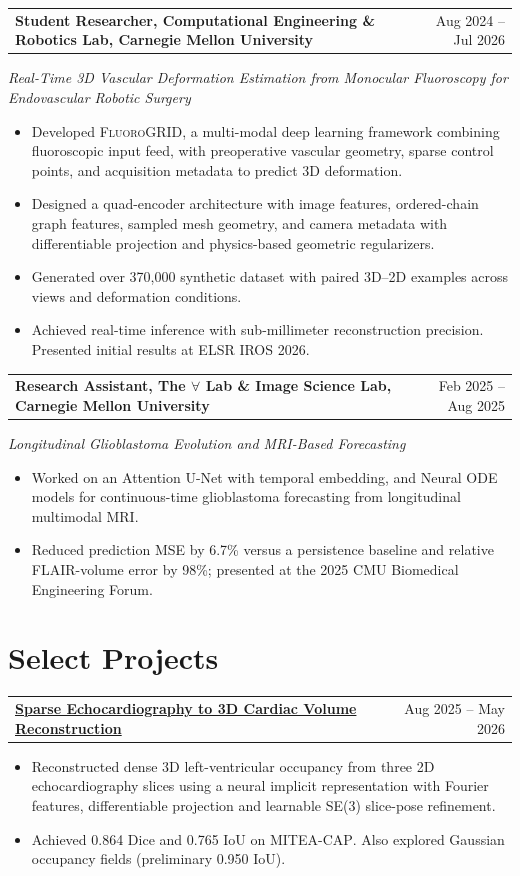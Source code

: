 \documentclass[letterpaper,10pt]{article}
\makeatletter
\newlength{\entrygap}
\newcommand{\cvProject}[2]{%
  \needspace{3\baselineskip}%
  \begin{tabularx}{\textwidth}{@{}X@{\hspace{0.5em}}r@{}}
    \textbf{#1} & {\small #2}
  \end{tabularx}\par\vspace{1pt}%
}
\newenvironment{cvitems}{%
  \begin{itemize}[leftmargin=0.17in,label=\textbullet,
    topsep=0pt,itemsep=2pt,parsep=0pt,partopsep=0pt]
  \normalsize
}{%
  \end{itemize}\vspace{\entrygap}%
}
\makeatother
\begin{document}
\cvProject{Student Researcher\textnormal{, Computational Engineering \& Robotics Lab, Carnegie Mellon University}}{Aug 2024 -- Jul 2026}
{\small\textit{Real-Time 3D Vascular Deformation Estimation from Monocular Fluoroscopy for Endovascular Robotic Surgery}}\par\vspace{2pt}
\begin{cvitems}
  \item Developed {\textsc{FluoroGRID}}, a multi-modal deep learning framework combining fluoroscopic input feed, with preoperative vascular geometry, sparse control points, and acquisition metadata to predict 3D deformation.
  \item Designed a quad-encoder architecture with image features, ordered-chain graph features, sampled mesh geometry, and camera metadata with differentiable projection and  physics-based geometric regularizers.
  \item Generated over 370,000 synthetic dataset with paired 3D--2D examples across views and deformation conditions.
\item Achieved real-time inference with sub-millimeter reconstruction precision. Presented initial results at ELSR IROS 2026.
\end{cvitems}

\cvProject{Research Assistant\textnormal{, The $\forall$ Lab \& Image Science Lab, Carnegie Mellon University}}{Feb 2025 -- Aug 2025}
{\small\textit{Longitudinal Glioblastoma Evolution and MRI-Based Forecasting}}\par\vspace{2pt}
\begin{cvitems}
  \item Worked on an Attention U-Net with temporal embedding, and Neural ODE models for continuous-time
        glioblastoma forecasting from longitudinal multimodal MRI.
  \item Reduced prediction MSE by 6.7\% versus a persistence baseline and relative FLAIR-volume
        error by 98\%; presented at the 2025 CMU Biomedical Engineering Forum.
\end{cvitems}

\section{Select Projects}
\cvProject{\href{https://github.com/tushar-nayak/cardiac-reconstruction-evolved}{Sparse Echocardiography to 3D Cardiac Volume Reconstruction}}{Aug 2025 -- May 2026}
\begin{cvitems}
  \item Reconstructed dense 3D left-ventricular occupancy from three 2D echocardiography slices
        using a neural implicit representation with Fourier features, differentiable projection and learnable SE(3) slice-pose refinement. 
  \item 
        Achieved 0.864 Dice and 0.765 IoU on \textsc{MITEA-CAP}. Also explored Gaussian occupancy fields (preliminary 0.950 IoU).
\end{cvitems}
\end{document}
